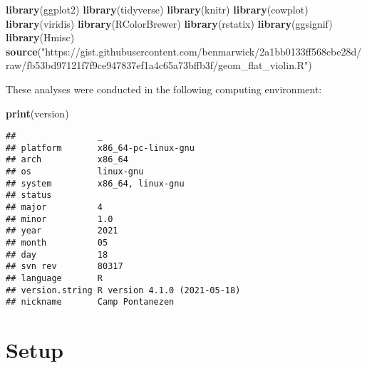 \documentclass[]{book}
\newenvironment{Shaded}{\begin{snugshade}}{\end{snugshade}}
\newcommand{\KeywordTok}[1]{\textcolor[rgb]{0.13,0.29,0.53}{\textbf{#1}}}
\newcommand{\NormalTok}[1]{#1}
\newcommand{\StringTok}[1]{\textcolor[rgb]{0.31,0.60,0.02}{#1}}
\begin{document}
\begin{Shaded}
\begin{Highlighting}[]
\KeywordTok{library}\NormalTok{(ggplot2)}
\KeywordTok{library}\NormalTok{(tidyverse)}
\KeywordTok{library}\NormalTok{(knitr)}
\KeywordTok{library}\NormalTok{(cowplot)}
\KeywordTok{library}\NormalTok{(viridis)}
\KeywordTok{library}\NormalTok{(RColorBrewer)}
\KeywordTok{library}\NormalTok{(rstatix)}
\KeywordTok{library}\NormalTok{(ggsignif)}
\KeywordTok{library}\NormalTok{(Hmisc)}
\KeywordTok{source}\NormalTok{(}\StringTok{"https://gist.githubusercontent.com/benmarwick/2a1bb0133ff568cbe28d/raw/fb53bd97121f7f9ce947837ef1a4c65a73bffb3f/geom_flat_violin.R"}\NormalTok{)}
\end{Highlighting}
\end{Shaded}

These analyses were conducted in the following computing environment:

\begin{Shaded}
\begin{Highlighting}[]
\KeywordTok{print}\NormalTok{(version)}
\end{Highlighting}
\end{Shaded}

\begin{verbatim}
##                _                           
## platform       x86_64-pc-linux-gnu         
## arch           x86_64                      
## os             linux-gnu                   
## system         x86_64, linux-gnu           
## status                                     
## major          4                           
## minor          1.0                         
## year           2021                        
## month          05                          
## day            18                          
## svn rev        80317                       
## language       R                           
## version.string R version 4.1.0 (2021-05-18)
## nickname       Camp Pontanezen
\end{verbatim}

\hypertarget{setup-8}{%
\section{Setup}\label{setup-8}}
\end{document}
